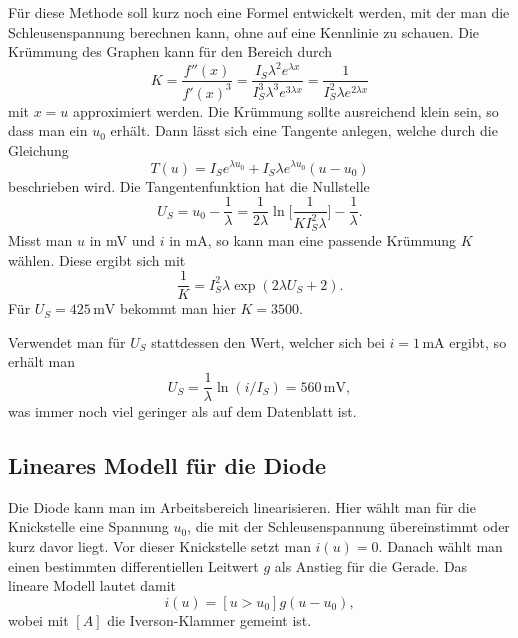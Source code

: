 \documentclass[a4paper,10pt,fleqn,twocolumn,twoside]{article}
\numberwithin{equation}{section}
\begin{document}
Für diese Methode soll kurz noch eine Formel entwickelt werden,
mit der man die Schleusenspannung berechnen kann, ohne
auf eine Kennlinie zu schauen. Die Krümmung des Graphen kann für den
Bereich durch
\begin{equation}
K = \frac{f''(x)}{f'(x)^3}
= \frac{I_S\lambda^2 e^{\lambda x}}{I_S^3\lambda^3 e^{3\lambda x}}
= \frac{1}{I_S^2\lambda e^{2\lambda x}}
\end{equation}
mit $x=u$ approximiert werden. Die Krümmung sollte ausreichend
klein sein, so dass man ein $u_0$ erhält.
Dann lässt sich eine Tangente anlegen, welche
durch die Gleichung
\begin{equation}
T(u) = I_S e^{\lambda u_0}+I_S \lambda e^{\lambda u_0}(u-u_0)
\end{equation}
beschrieben wird. Die Tangentenfunktion hat die Nullstelle
\begin{equation}
U_S = u_0-\frac{1}{\lambda} = \frac{1}{2\lambda}
\ln\bigg[\frac{1}{KI_S^2\lambda}\bigg]-\frac{1}{\lambda}.
\end{equation}
Misst man $u$ in mV und $i$ in mA, so kann man eine passende
Krümmung $K$ wählen. Diese ergibt sich mit
\begin{equation}
\frac{1}{K} = I_S^2\lambda\exp(2\lambda U_S+2).
\end{equation}
Für $U_S=425\,\mathrm{mV}$ bekommt man hier $K=3500$.

Verwendet man für $U_S$ stattdessen den Wert, welcher sich
bei $i=1\,\mathrm{mA}$ ergibt, so erhält man
\begin{equation}
U_S = \frac{1}{\lambda}\ln(i/I_S) = 560\,\mathrm{mV},
\end{equation}
was immer noch viel geringer als auf dem Datenblatt ist.

\subsection{Lineares Modell für die Diode}
Die Diode kann man im Arbeitsbereich linearisieren.
Hier wählt man für die Knickstelle eine Spannung $u_0$,
die mit der Schleusenspannung übereinstimmt oder kurz davor
liegt. Vor dieser Knickstelle setzt man $i(u)=0$. Danach
wählt man einen bestimmten differentiellen Leitwert $g$
als Anstieg für die Gerade. Das lineare Modell lautet
damit
\begin{equation}
i(u) = [u>u_0]g(u-u_0),
\end{equation}
wobei mit $[A]$ die Iverson-Klammer gemeint ist.
\end{document}

